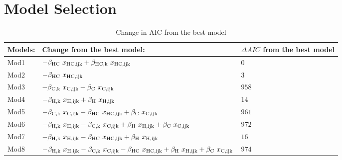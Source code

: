 
\section{Model Selection} \label{modsel}

\begin{table}[H]
\centering
\begin{tabular}{ |p{1.5cm}|p{8cm}|p{3cm}| }
    \hline
    Models: & Change from the best model: & $\Delta AIC$ from the best model \\
    \hline
    Mod1 &$-\beta_\text{HC} \ x_\text{HC,ij\text{k}} + \beta_\text{HC,\text{k}} \ x_\text{HC,ij\text{k}}$ & $0$ \\
    \hline
    Mod2 &$-\beta_\text{HC} \ x_\text{HC,ij\text{k}}$ & $3$ \\
    \hline
    Mod3 &$-\beta_{\text{C},\text{k}} \ x_\text{C,ij\text{k}} + \beta_{\text{C}} \ x_\text{C,ij\text{k}}$ & $958$ \\
    \hline
    Mod4 &$-\beta_{\text{H},\text{k}} \ x_\text{H,ij\text{k}} + \beta_{\text{H}} \ x_\text{H,ij\text{k}}$ & $14$ \\
    \hline
    Mod5 &$-\beta_{\text{C},\text{k}} \ x_\text{C,ij\text{k}} - \beta_\text{HC} \ x_\text{HC,ij\text{k}} + \beta_{\text{C}} \ x_\text{C,ij\text{k}}$ & $961$ \\
    \hline
    Mod6 &$-\beta_{\text{H},\text{k}} \ x_\text{H,ij\text{k}} - \beta_{\text{C},\text{k}} \ x_\text{C,ij\text{k}} + \beta_{\text{H}} \ x_\text{H,ij\text{k}} + \beta_{\text{C}} \ x_\text{C,ij\text{k}}$ & $972$ \\
    \hline
    Mod7 &$-\beta_{\text{H},\text{k}} \ x_\text{H,ij\text{k}} - \beta_\text{HC} \ x_\text{HC,ij\text{k}} + \beta_{\text{H}} \ x_\text{H,ij\text{k}}$ & $16$ \\
    \hline
    Mod8 &$-\beta_{\text{H},\text{k}} \ x_\text{H,ij\text{k}} - \beta_{\text{C},\text{k}} \ x_\text{C,ij\text{k}} - \beta_\text{HC} \ x_\text{HC,ij\text{k}} + \beta_{\text{H}} \ x_\text{H,ij\text{k}} + \beta_{\text{C}} \ x_\text{C,ij\text{k}}$ & $974$ \\
    \hline
\end{tabular}
\caption{Change in AIC from the best model}
\label{table:AICchangeCovid}
\end{table}

